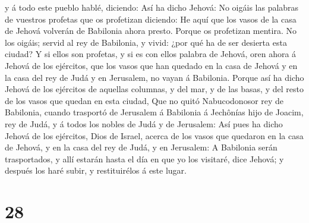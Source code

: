 y á todo este pueblo hablé, diciendo: Así ha dicho Jehová: No oigáis las
palabras de vuestros profetas que os profetizan diciendo: He aquí que
los vasos de la casa de Jehová volverán de Babilonia ahora presto.
Porque os profetizan mentira.  No los oigáis; servid al
rey de Babilonia, y vivid: ¿por qué ha de ser desierta esta ciudad?
 Y si ellos son profetas, y si es con ellos palabra de
Jehová, oren ahora á Jehová de los ejércitos, que los vasos que han
quedado en la casa de Jehová y en la casa del rey de Judá y en
Jerusalem, no vayan á Babilonia.  Porque así ha dicho
Jehová de los ejércitos de aquellas columnas, y del mar, y de las basas,
y del resto de los vasos que quedan en esta ciudad,  Que
no quitó Nabucodonosor rey de Babilonia, cuando trasportó de Jerusalem á
Babilonia á Jechônías hijo de Joacim, rey de Judá, y á todos los nobles
de Judá y de Jerusalem:  Así pues ha dicho Jehová de los
ejércitos, Dios de Israel, acerca de los vasos que quedaron en la casa
de Jehová, y en la casa del rey de Judá, y en Jerusalem: 
A Babilonia serán trasportados, y allí estarán hasta el día en que yo
los visitaré, dice Jehová; y después los haré subir, y restituirélos á
este lugar.

\hypertarget{section-27}{%
\section{28}\label{section-27}}

